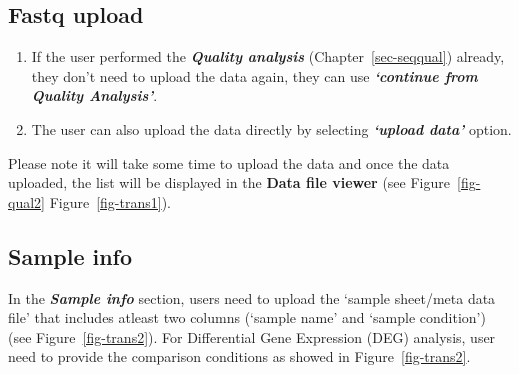 \documentclass[
  a4paper,
  DIV=11,
  numbers=noendperiod,
  oneside,
  open=any]{scrreport}
\providecommand{\tightlist}{%
  \setlength{\itemsep}{0pt}\setlength{\parskip}{0pt}}\usepackage{longtable,booktabs,array}
\begin{document}
\subsection{Fastq upload}\label{fastq-upload}

\begin{enumerate}
\def\labelenumi{\arabic{enumi}.}
\tightlist
\item
  If the user performed the \textbf{\emph{Quality analysis}}
  (Chapter~\ref{sec-seqqual}) already, they don't need to upload the
  data again, they can use \textbf{\emph{`continue from Quality
  Analysis'}}.
\item
  The user can also upload the data directly by selecting
  \textbf{\emph{`upload data'}} option.
\end{enumerate}

\begin{tcolorbox}[enhanced jigsaw, coltitle=black, colback=white, title=\textcolor{quarto-callout-note-color}{\faInfo}\hspace{0.5em}{Note}, leftrule=.75mm, titlerule=0mm, colframe=quarto-callout-note-color-frame, toprule=.15mm, opacityback=0, arc=.35mm, breakable, rightrule=.15mm, colbacktitle=quarto-callout-note-color!10!white, bottomtitle=1mm, opacitybacktitle=0.6, left=2mm, bottomrule=.15mm, toptitle=1mm]

Please note it will take some time to upload the data and once the data
uploaded, the list will be displayed in the \textbf{Data file viewer}
(see Figure~\ref{fig-qual2} Figure~\ref{fig-trans1}).

\end{tcolorbox}

\subsection{Sample info}\label{sec-sampleinfo}

In the \textbf{\emph{Sample info}} section, users need to upload the
`sample sheet/meta data file' that includes atleast two columns (`sample
name' and `sample condition') (see Figure~\ref{fig-trans2}). For
Differential Gene Expression (DEG) analysis, user need to provide the
comparison conditions as showed in Figure~\ref{fig-trans2}.
\end{document}
